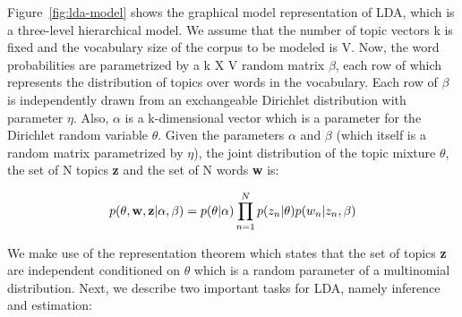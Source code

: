 \documentclass{article} %
\begin{document}
Figure~\ref{fig:lda-model} shows the graphical model representation of LDA, which is
a three-level hierarchical model. We
assume that the number of topic vectors k is fixed and the vocabulary size of
the corpus to be modeled is V. Now, the word probabilities are parametrized
by a k X V random matrix $\beta$, each row of which represents the distribution 
of topics over words in the vocabulary. Each row of $\beta$ is independently 
drawn from an exchangeable Dirichlet distribution with parameter $\eta$.
Also, $\alpha$ is a k-dimensional vector 
which is a parameter for the Dirichlet random variable $\theta$. Given the
parameters $\alpha$ and $\beta$ (which itself is a random matrix parametrized
by $\eta$), the joint distribution of the topic mixture
$\theta$, the set of N topics {\bf z} and the set of N words {\bf w} is:

\begin{equation} \label{eq1}
p(\theta,{\bf w},{\bf z} | \alpha,\beta ) = p(\theta|\alpha)\prod_{n=1}^{N}p(z_{n}|\theta)p(w_{n}|z_{n},\beta) 
\end{equation}

We make use of the representation theorem which states that the set of topics
{\bf z} are independent conditioned on $\theta$ which is a random parameter of 
a multinomial distribution. Next, we describe two important tasks for LDA, 
namely inference and estimation:
\end{document}

